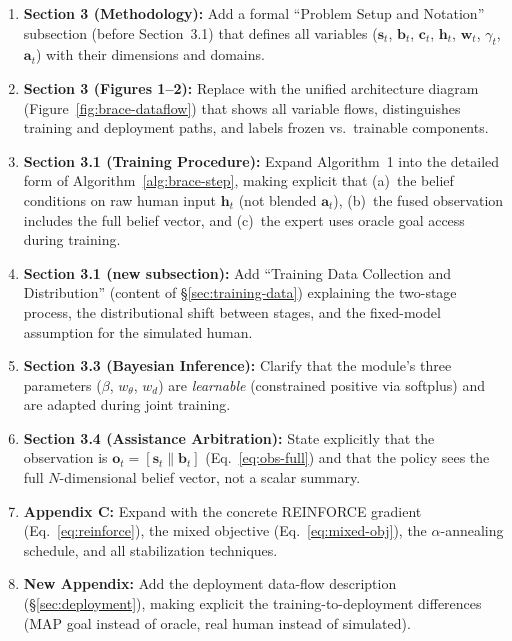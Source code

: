 \documentclass[11pt]{article}
\newcommand{\bvec}{\mathbf{b}_t}
\newcommand{\svec}{\mathbf{s}_t}
\newcommand{\cvec}{\mathbf{c}_t}
\newcommand{\hvec}{\mathbf{h}_t}
\newcommand{\wvec}{\mathbf{w}_t}
\newcommand{\avec}{\mathbf{a}_t}
\begin{document}
\begin{enumerate}
    \item \textbf{Section 3 (Methodology):} Add a formal ``Problem Setup and Notation'' subsection (before Section~3.1) that defines all variables ($\svec$, $\bvec$, $\cvec$, $\hvec$, $\wvec$, $\gamma_t$, $\avec$) with their dimensions and domains.

    \item \textbf{Section 3 (Figures 1--2):} Replace with the unified architecture diagram (Figure~\ref{fig:brace-dataflow}) that shows all variable flows, distinguishes training and deployment paths, and labels frozen vs.\ trainable components.

    \item \textbf{Section 3.1 (Training Procedure):} Expand Algorithm~1 into the detailed form of Algorithm~\ref{alg:brace-step}, making explicit that (a)~the belief conditions on raw human input $\hvec$ (not blended $\avec$), (b)~the fused observation includes the full belief vector, and (c)~the expert uses oracle goal access during training.

    \item \textbf{Section 3.1 (new subsection):} Add ``Training Data Collection and Distribution'' (content of \S\ref{sec:training-data}) explaining the two-stage process, the distributional shift between stages, and the fixed-model assumption for the simulated human.

    \item \textbf{Section 3.3 (Bayesian Inference):} Clarify that the module's three parameters ($\beta$, $w_\theta$, $w_d$) are \emph{learnable} (constrained positive via softplus) and are adapted during joint training.

    \item \textbf{Section 3.4 (Assistance Arbitration):} State explicitly that the observation is $\mathbf{o}_t = [\svec \| \bvec]$ (Eq.~\ref{eq:obs-full}) and that the policy sees the full $N$-dimensional belief vector, not a scalar summary.

    \item \textbf{Appendix C:} Expand with the concrete REINFORCE gradient (Eq.~\ref{eq:reinforce}), the mixed objective (Eq.~\ref{eq:mixed-obj}), the $\alpha$-annealing schedule, and all stabilization techniques.

    \item \textbf{New Appendix:} Add the deployment data-flow description (\S\ref{sec:deployment}), making explicit the training-to-deployment differences (MAP goal instead of oracle, real human instead of simulated).
\end{enumerate}
\end{document}
